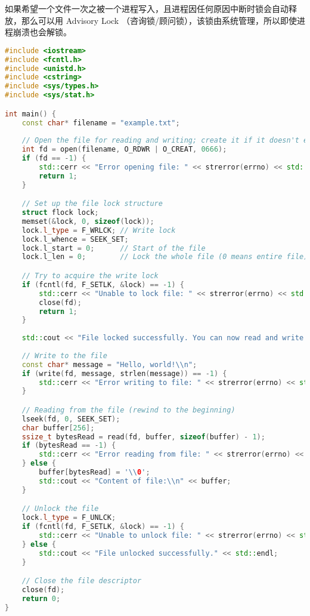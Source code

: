 
如果希望一个文件一次之被一个进程写入，且进程因任何原因中断时锁会自动释放，那么可以用 Advisory Lock （咨询锁/顾问锁），该锁由系统管理，所以即使进程崩溃也会解锁。

\begin{lstlisting}[language=cpp]
#include <iostream>
#include <fcntl.h>
#include <unistd.h>
#include <cstring>
#include <sys/types.h>
#include <sys/stat.h>

int main() {
    const char* filename = "example.txt";
    
    // Open the file for reading and writing; create it if it doesn't exist
    int fd = open(filename, O_RDWR | O_CREAT, 0666);
    if (fd == -1) {
        std::cerr << "Error opening file: " << strerror(errno) << std::endl;
        return 1;
    }

    // Set up the file lock structure
    struct flock lock;
    memset(&lock, 0, sizeof(lock));
    lock.l_type = F_WRLCK; // Write lock
    lock.l_whence = SEEK_SET;
    lock.l_start = 0;      // Start of the file
    lock.l_len = 0;        // Lock the whole file (0 means entire file)

    // Try to acquire the write lock
    if (fcntl(fd, F_SETLK, &lock) == -1) {
        std::cerr << "Unable to lock file: " << strerror(errno) << std::endl;
        close(fd);
        return 1;
    }
    
    std::cout << "File locked successfully. You can now read and write." << std::endl;
    
    // Write to the file
    const char* message = "Hello, world!\\n";
    if (write(fd, message, strlen(message)) == -1) {
        std::cerr << "Error writing to file: " << strerror(errno) << std::endl;
    }

    // Reading from the file (rewind to the beginning)
    lseek(fd, 0, SEEK_SET);
    char buffer[256];
    ssize_t bytesRead = read(fd, buffer, sizeof(buffer) - 1);
    if (bytesRead == -1) {
        std::cerr << "Error reading from file: " << strerror(errno) << std::endl;
    } else {
        buffer[bytesRead] = '\\0';
        std::cout << "Content of file:\\n" << buffer;
    }

    // Unlock the file
    lock.l_type = F_UNLCK;
    if (fcntl(fd, F_SETLK, &lock) == -1) {
        std::cerr << "Unable to unlock file: " << strerror(errno) << std::endl;
    } else {
        std::cout << "File unlocked successfully." << std::endl;
    }

    // Close the file descriptor
    close(fd);
    return 0;
}

\end{lstlisting}